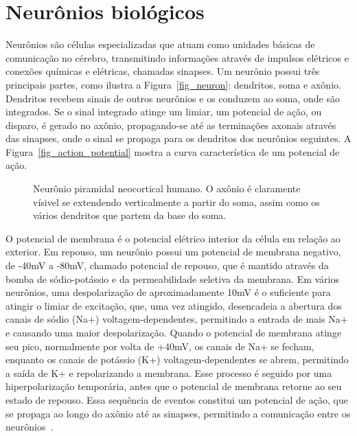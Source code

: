 \section{Neurônios biológicos}\label{sec_neurônios}

Neurônios são células especializadas que atuam como unidades básicas de comunicação no cérebro, transmitindo informações através
de impulsos elétricos e conexões químicas e elétricas, chamadas sinapses. Um neurônio possui três principais partes, como ilustra
a Figura~\ref{fig_neuron}: dendritos, soma e axônio. Dendritos recebem sinais de outros neurônios e os conduzem ao soma,
onde são integrados. Se o sinal integrado atinge um limiar, um potencial de ação, ou disparo, é gerado no axônio, propagando-se
até as terminações axonais através das sinapses, onde o sinal se propaga para os dendritos dos neurônios seguintes. A
Figura~\ref{fig_action_potential} mostra a curva característica de um potencial de ação.

\begin{figure}[!ht]
\caption{Neurônio piramidal neocortical humano. O axônio é claramente vísivel se extendendo verticalmente a partir do soma, assim
como os vários dendritos que partem da base do soma.}
\end{figure}

O potencial de membrana é o potencial elétrico interior da célula em relação ao exterior. Em repouso, um neurônio possui um
potencial de membrana negativo, de -40mV a -80mV, chamado potencial de repouso, que é mantido através da bomba de sódio-potássio e
da permeabilidade seletiva da membrana. Em vários neurônios, uma despolarização de aproximadamente 10mV é o suficiente para
atingir o limiar de excitação, que, uma vez atingido, desencadeia a abertura dos canais de sódio (Na+) voltagem-dependentes,
permitindo a entrada de mais Na+ e causando uma maior despolarização. Quando o potencial de membrana atinge seu pico, normalmente
por volta de +40mV, os canais de Na+ se fecham, enquanto os canais de potássio (K+) voltagem-dependentes se abrem, permitindo a
saída de K+ e repolarizando a membrana. Esse processo é seguido por uma hiperpolarização temporária, antes que o potencial de
membrana retorne ao seu estado de repouso. Essa sequência de eventos constitui um potencial de ação, que se propaga ao longo do
axônio até as sinapses, permitindo a comunicação entre os neurônios~\cite{kandelPrinciples2021}.

